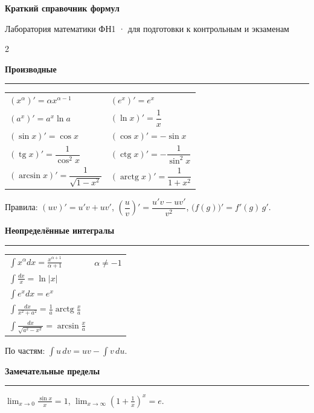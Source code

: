 \documentclass[11pt, a4paper]{article}
\newcommand{\block}[1]{\vspace{0.6em}\textbf{#1}\vspace{0.25em}\hrule\vspace{0.5em}}
\begin{document}
\begin{center}
  {\Large\bfseries Краткий справочник формул}

  \vspace{0.3em}
  {\small Лаборатория математики ФН1 · для подготовки к контрольным и экзаменам}
\end{center}

\vspace{0.8em}

\begin{multicols}{2}

\block{Производные}

\begin{tabular}{@{}ll@{}}
  $(x^{\alpha})' = \alpha x^{\alpha-1}$ & $(e^x)' = e^x$ \\[2pt]
  $(a^x)' = a^x\ln a$ & $(\ln x)' = \dfrac{1}{x}$ \\[4pt]
  $(\sin x)' = \cos x$ & $(\cos x)' = -\sin x$ \\[4pt]
  $(\operatorname{tg} x)' = \dfrac{1}{\cos^2 x}$ & $(\operatorname{ctg} x)' = -\dfrac{1}{\sin^2 x}$ \\[6pt]
  $(\arcsin x)' = \dfrac{1}{\sqrt{1-x^2}}$ & $(\operatorname{arctg} x)' = \dfrac{1}{1+x^2}$
\end{tabular}

\vspace{0.4em}
Правила: $(uv)' = u'v + uv'$, \quad
$\left(\dfrac{u}{v}\right)' = \dfrac{u'v - uv'}{v^2}$, \quad
$\big(f(g)\big)' = f'(g)\,g'$.

\block{Неопределённые интегралы}

\begin{tabular}{@{}ll@{}}
  $\displaystyle\int x^{\alpha}dx = \frac{x^{\alpha+1}}{\alpha+1}$ & $\alpha \ne -1$ \\[8pt]
  $\displaystyle\int \frac{dx}{x} = \ln|x|$ & \\[8pt]
  $\displaystyle\int e^x dx = e^x$ & \\[8pt]
  $\displaystyle\int \frac{dx}{x^2 + a^2} = \frac{1}{a}\operatorname{arctg}\frac{x}{a}$ & \\[8pt]
  $\displaystyle\int \frac{dx}{\sqrt{a^2 - x^2}} = \arcsin\frac{x}{a}$ &
\end{tabular}

\vspace{0.4em}
По частям: $\displaystyle\int u\,dv = uv - \int v\,du$.

\block{Замечательные пределы}

$\displaystyle\lim_{x\to 0}\frac{\sin x}{x} = 1$, \qquad
$\displaystyle\lim_{x\to\infty}\left(1 + \frac{1}{x}\right)^{x} = e$.


\end{multicols}
\end{document}
